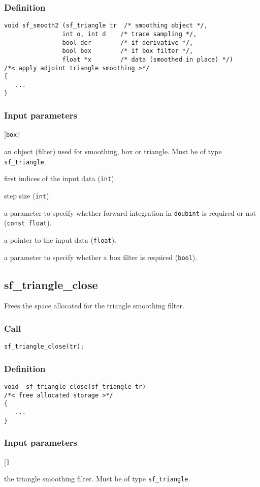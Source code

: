 \subsubsection*{Definition}
\begin{verbatim}
void sf_smooth2 (sf_triangle tr  /* smoothing object */, 
                int o, int d    /* trace sampling */, 
                bool der        /* if derivative */, 
                bool box        /* if box filter */,
                float *x        /* data (smoothed in place) */)
/*< apply adjoint triangle smoothing >*/
{
   ...   
}
\end{verbatim}

\subsubsection*{Input parameters}
\begin{desclist}{\tt }{\quad}[\tt box]
   \setlength\itemsep{0pt}
   \item[tr]  an object (filter) used for smoothing, box or triangle. Must be of type \texttt{sf\_triangle}. 
   \item[o]   first indices of the input data (\texttt{int}).  
   \item[d]   step size (\texttt{int}). 
   \item[der] a parameter to specify whether forward integration in \texttt{doubint} is required or not (\texttt{const float}).  
   \item[x]   a pointer to the input data (\texttt{float}). 
   \item[box] a parameter to specify whether a box filter is required (\texttt{bool}).
 \end{desclist}




\subsection{{sf\_triangle\_close}}
Frees the space allocated for the triangle smoothing filter.

\subsubsection*{Call}
\begin{verbatim}sf_triangle_close(tr);\end{verbatim}

\subsubsection*{Definition}
\begin{verbatim}
void  sf_triangle_close(sf_triangle tr)
/*< free allocated storage >*/
{
   ...
}
\end{verbatim}

\subsubsection*{Input parameters}
\begin{desclist}{\tt }{\quad}[\tt ]
   \setlength\itemsep{0pt}
   \item[tr] the triangle smoothing filter. Must be of type \texttt{sf\_triangle}.            
\end{desclist}





